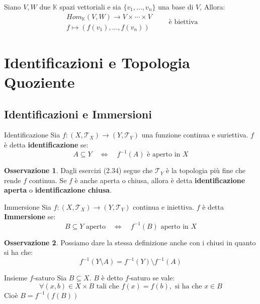 \documentclass[11pt,a4paper,twoside]{article}
\theoremstyle{definition}
\newtheorem*{oss}{Osservazione}
\begin{document}
\begin{prop}{}{}
	Siano $V, W$ due $\mathbb K$ spazi vettoriali e sia $\{v_1,...,v_n\}$ una base di $V$, Allora:
	\[\begin{matrix} Hom_\mathbb K(V, W) \to V \times \cdots \times V\\ f \mapsto (f(v_1),...,f(v_n))\end{matrix}\qquad \text{è biettiva}\]
\end{prop}

\newpage

\section{Identificazioni e Topologia Quoziente}

\subsection{Identificazioni e Immersioni}

\begin{defn}{Identificazione}{}
	Sia $f: (X, \mathcal T_X) \to (Y, \mathcal T_Y)$ una funzione continua e suriettiva. $f$ è detta \textbf{identificazione} se:
	\[ A \subseteq Y \quad \Leftrightarrow \quad f^{-1}(A) \text{ è aperto in }X\]
\end{defn}

\begin{oss}
	Dagli esercizi (2.34) segue che $\mathcal T_Y$ è la topologia più fine che rende $f$ continua. Se $f$ è anche aperta o chiusa, allora è detta \textbf{identificazione aperta} o \textbf{identificazione chiusa}.
\end{oss}

\begin{defn}{Immersione}{}
	Sia $f:(X,\mathcal T_X) \to (Y, \mathcal T_Y) $ continua e iniettiva. $f$ è detta \textbf{Immersione} se:
	\[ B \subseteq Y \text{ aperto}\quad \Leftrightarrow \quad f^{-1}(B)\text{ aperto in }X \]
\end{defn}

\begin{oss}
	Possiamo dare la stessa definizione anche con i chiusi in quanto si ha che:
	\[ f^{-1}(Y \setminus A) = f^{-1}(Y) \setminus f^{-1}(A) \]
\end{oss}

\begin{defn}{Insieme $f$-saturo}{}
	Sia $B\subseteq X$. $B$ è detto $f$-saturo se vale:
	\[\forall (x,b) \in X \times B\text{ tali che }f(x) = f(b), \text{ si ha che }x \in B\]
	Cioè $B = f^{-1}(f(B))$
\end{defn}
\end{document}
